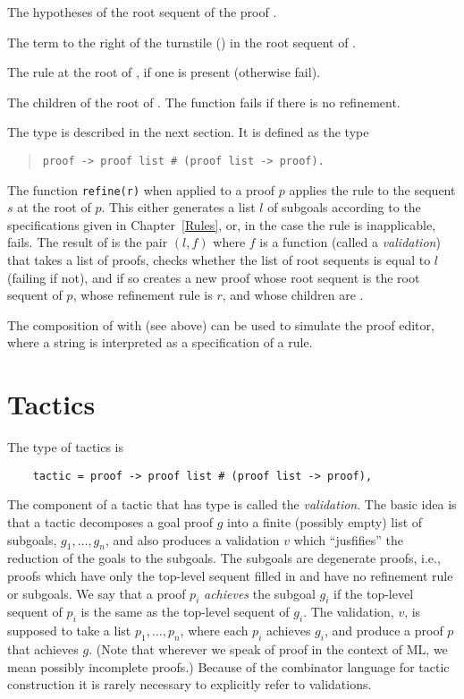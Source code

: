 The hypotheses of the root sequent of the proof . 

The term to the right of the turnstile (\tid{>>}) in the root sequent
of .

  The rule at the root of , if
one is present (otherwise fail).

  The children of the root of
.  The function fails if there is no refinement.

  The type  is described in the
next section.  It is defined as the type
\begin{quote}
\tt proof -> proof list \# (proof list -> proof).
\end{quote}
The function {\tt refine(r)} when 
applied to a proof $p$ applies the rule 
to the sequent $s$ at the root of $p$.  This either generates a list $l$ of
subgoals according to the specifications given in Chapter~\ref{Rules}, or,
in the case the rule is inapplicable, fails.  The result of 
is the pair $(l,f)$ where $f$ is a function (called a {\em validation})
that takes a list  of proofs, checks whether the list of root
sequents is equal to $l$ (failing if not), and if so creates a new proof
whose root sequent is the root sequent of $p$, whose refinement rule is
$r$, and whose children are .

The composition of  with  (see
above) can be used to simulate the proof editor, where a string is
interpreted as a specification of a rule.


\section{Tactics}





The type of tactics is
\begin{verbatim}
    tactic = proof -> proof list # (proof list -> proof),
\end{verbatim}
The component of a tactic that has type  is
called the {\em validation}.  The basic idea is that a tactic decomposes a
goal proof $g$ into a finite (possibly empty) list of subgoals, $g_1,\ldots
,g_n$, and also produces a validation $v$ which ``jusfifies'' the reduction
of the goals to the subgoals.  The subgoals are degenerate proofs, i.e.,
proofs which have only the top-level sequent filled in and have no
refinement rule or subgoals.  We say that a proof $p_i$ {\em achieves} the
subgoal $g_i$ if the top-level sequent of $p_i$ is the same as the
top-level sequent of $g_i$.  The validation, $v$, is supposed to take a
list $p_1,\ldots ,p_n$, where each $p_i$ achieves $g_i$, and produce a
proof $p$ that achieves $g$. (Note that wherever we speak of proof in the
context of ML, we mean possibly incomplete proofs.)  Because of the
combinator language for tactic construction it is rarely necessary to
explicitly refer to validations.


